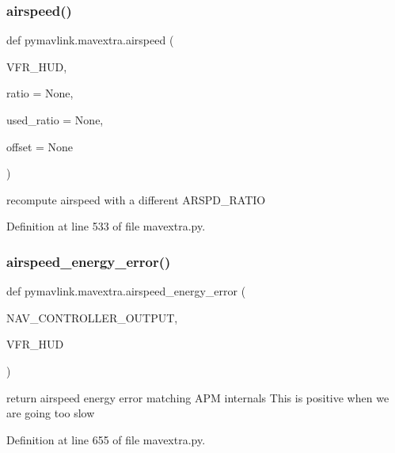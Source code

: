 \subsubsection{\texorpdfstring{airspeed()}{airspeed()}}
{\footnotesize\ttfamily def pymavlink.\+mavextra.\+airspeed (\begin{DoxyParamCaption}\item[{}]{V\+F\+R\+\_\+\+H\+UD,  }\item[{}]{ratio = {\ttfamily None},  }\item[{}]{used\+\_\+ratio = {\ttfamily None},  }\item[{}]{offset = {\ttfamily None} }\end{DoxyParamCaption})}

\begin{DoxyVerb}recompute airspeed with a different ARSPD_RATIO\end{DoxyVerb}
 

Definition at line 533 of file mavextra.\+py.

\mbox{\label{namespacepymavlink_1_1mavextra_ac195697770b7a0067e109293778a73e1}} 
\subsubsection{\texorpdfstring{airspeed\_energy\_error()}{airspeed\_energy\_error()}}
{\footnotesize\ttfamily def pymavlink.\+mavextra.\+airspeed\+\_\+energy\+\_\+error (\begin{DoxyParamCaption}\item[{}]{N\+A\+V\+\_\+\+C\+O\+N\+T\+R\+O\+L\+L\+E\+R\+\_\+\+O\+U\+T\+P\+UT,  }\item[{}]{V\+F\+R\+\_\+\+H\+UD }\end{DoxyParamCaption})}

\begin{DoxyVerb}return airspeed energy error matching APM internals
This is positive when we are going too slow
\end{DoxyVerb}
 

Definition at line 655 of file mavextra.\+py.

\mbox{\label{namespacepymavlink_1_1mavextra_a9bc2701bc2b4da0a2e4ee303c7cecf65}} 
